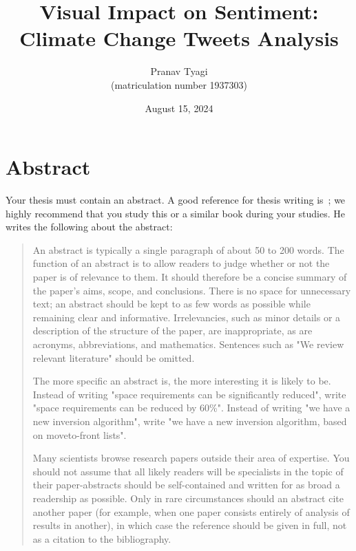\documentclass[a4paper,oneside,bibliography=totoc]{scrbook}
\begin{document}
\frontmatter \subject{Master Thesis} %
\title{Visual Impact on Sentiment: Climate Change Tweets Analysis}
\author{Pranav Tyagi\\
  (matriculation number 1937303)} \date{August 15, 2024}
\publishers{{\small Submitted to}\\
  Data and Web Science Group\\
  Prof.\ Dr.\ Margret Keuper\\
  University of Mannheim\\}
\maketitle

\chapter{Abstract}

Your thesis must contain an abstract. A good reference for thesis writing
is~\citet{zobel2014}; we highly recommend that you study this or a similar book
during your studies. He writes the following about the abstract:

\blockcquote{zobel2004}{%
  An abstract is typically a single paragraph of about 50 to 200 words. The
  function of an abstract is to allow readers to judge whether or not the paper
  is of relevance to them. It should therefore be a concise summary of the
  paper's aims, scope, and conclusions. There is no space for unnecessary text;
  an abstract should be kept to as few words as possible while remaining clear
  and informative. Irrelevancies, such as minor details or a description of the
  structure of the paper, are inappropriate, as are acronyms, abbreviations, and
  mathematics. Sentences such as "We review relevant literature" should be
  omitted.

  The more specific an abstract is, the more interesting it is likely to be.
  Instead of writing "space requirements can be significantly reduced", write
  "space requirements can be reduced by 60\%". Instead of writing "we have a new
  inversion algorithm", write "we have a new inversion algorithm, based on
  move­to-front lists".

  Many scientists browse research papers outside their area of expertise. You
  should not assume that all likely readers will be specialists in the topic of
  their paper-abstracts should be self-contained and written for as broad a
  readership as possible. Only in rare circumstances should an abstract cite
  another paper (for example, when one paper consists entirely of analysis of
  results in another), in which case the reference should be given in full, not
  as a citation to the bibliography.}
\end{document}
